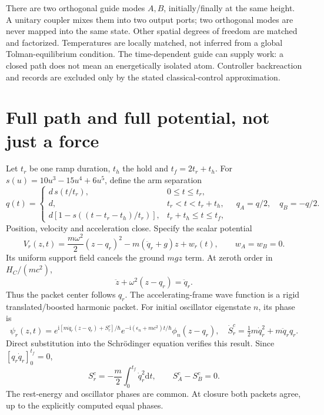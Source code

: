 \documentclass[11pt,a4paper]{article}
\newcommand{\dd}{\mathrm d}
\newcommand{\ii}{\mathrm i}
\begin{document}
There are two orthogonal guide modes $A,B$, initially/finally at the
same height. A unitary coupler mixes them into two output ports; two
orthogonal modes are never mapped into the same state. Other spatial
degrees of freedom are matched and factorized. Temperatures are locally
matched, not inferred from a global Tolman-equilibrium condition.
The time-dependent guide can supply work: a closed path does not mean
an energetically isolated atom. Controller backreaction and records are
excluded only by the stated classical-control approximation.

\newpage
\section{Full path and full potential, not just a force}
Let $t_r$ be one ramp duration, $t_h$ the hold and $t_f=2t_r+t_h$.
For $s(u)=10u^3-15u^4+6u^5$, define the arm separation
\begin{equation}
 q(t)=\begin{cases}
 d\,s(t/t_r),&0\leq t\leq t_r,\\
 d,&t_r<t<t_r+t_h,\\
 d[1-s((t-t_r-t_h)/t_r)],&t_r+t_h\leq t\leq t_f,
 \end{cases}\quad q_A=q/2,\quad q_B=-q/2 .\label{paths}
\end{equation}
Position, velocity and acceleration close. Specify the scalar potential
\begin{equation}
 V_r(z,t)=\frac{m\omega^2}{2}(z-q_r)^2-m(\ddot q_r+g)z+w_r(t),
 \qquad w_A=w_B=0 .\label{guide}
\end{equation}
Its uniform support field cancels the ground $mgz$ term.
At zeroth order in $H_C/(mc^2)$,
\begin{equation}
 \ddot z+\omega^2(z-q_r)=\ddot q_r .
\end{equation}
Thus the packet center follows $q_r$. The accelerating-frame wave
function is a rigid translated/boosted harmonic packet. For initial
oscillator eigenstate $n$, its phase is
\begin{equation}
 \psi_r(z,t)=
 e^{\ii[m\dot q_r(z-q_r)+S_r^c]/\hbar}
 e^{-\ii(\epsilon_n+mc^2)t/\hbar}\phi_n(z-q_r),\quad
 \dot S_r^c=\tfrac12m\dot q_r^2+m\ddot q_r q_r .\label{exactpacket}
\end{equation}
Direct substitution into the Schr\"odinger equation verifies this result.
Since $[q_r\dot q_r]_0^{t_f}=0$,
\begin{equation}
 S_r^c=-\frac m2\int_0^{t_f}\dot q_r^2\dd t,
 \qquad S_A^c-S_B^c=0 .\label{groundphase}
\end{equation}
The rest-energy and oscillator phases are common. At closure both
packets agree, up to the explicitly computed equal phases.
\end{document}
